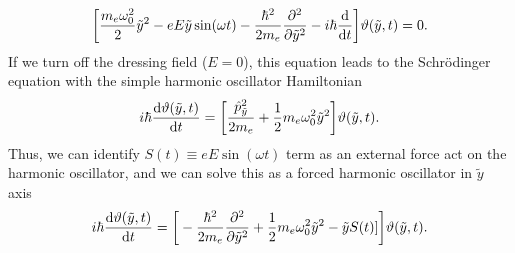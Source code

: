 \begin{equation} \label{eq:a6}
    \bigg[
    \frac{m_e \omega_0^2}{2}\tilde{y}^2
    - {eE\tilde{y}}\sin(\omega t)
    -
    \frac{\hbar^2}{2m_e}
    \pdv[2]{\tilde{y}}
    - i \hbar \dv{t}
    \bigg]
    \vartheta(\tilde{y},t) = 0.
\end{equation}
If we turn off the dressing field ($E=0$), this equation leads to the Schrödinger equation with the simple harmonic oscillator Hamiltonian
\begin{equation} \label{eq:a7}
     i \hbar \dv{\vartheta(\tilde{y},t)}{t} =
    \bigg[
    \frac{\hat{p}_{\tilde{y}}^2}{2m_e} +
    \frac{1}{2}m_e \omega_0^2\tilde{y}^2
    \bigg]
    \vartheta(\tilde{y},t).
\end{equation}
Thus, we can identify $S(t) \equiv eE\sin(\omega t)$ term as an external force act on the harmonic oscillator, and we can solve this as a forced harmonic oscillator in $\tilde{y}$ axis
\begin{equation} \label{eq:a8}
  \begin{aligned}
    i \hbar \dv{\vartheta(\tilde{y},t)}{t} =
    \bigg[
    -
    \frac{\hbar^2}{2m_e}
    \pdv[2]{\tilde{y}} +
    \frac{1}{2}m_e \omega_0^2\tilde{y}^2
    - \tilde{y}S(t)]
    \bigg]
    \vartheta(\tilde{y},t).
  \end{aligned}
\end{equation}

